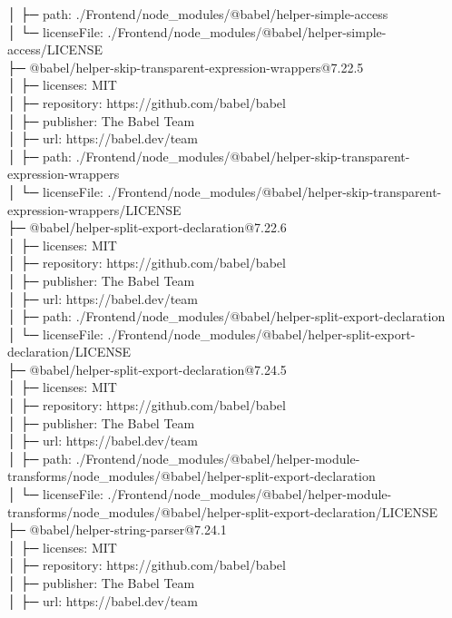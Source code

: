 │  ├─ path: ./Frontend/node\_modules/@babel/helper-simple-access\\
│  └─ licenseFile: ./Frontend/node\_modules/@babel/helper-simple-access/LICENSE\\
├─ @babel/helper-skip-transparent-expression-wrappers@7.22.5\\
│  ├─ licenses: MIT\\
│  ├─ repository: https://github.com/babel/babel\\
│  ├─ publisher: The Babel Team\\
│  ├─ url: https://babel.dev/team\\
│  ├─ path: ./Frontend/node\_modules/@babel/helper-skip-transparent-expression-wrappers\\
│  └─ licenseFile: ./Frontend/node\_modules/@babel/helper-skip-transparent-expression-wrappers/LICENSE\\
├─ @babel/helper-split-export-declaration@7.22.6\\
│  ├─ licenses: MIT\\
│  ├─ repository: https://github.com/babel/babel\\
│  ├─ publisher: The Babel Team\\
│  ├─ url: https://babel.dev/team\\
│  ├─ path: ./Frontend/node\_modules/@babel/helper-split-export-declaration\\
│  └─ licenseFile: ./Frontend/node\_modules/@babel/helper-split-export-declaration/LICENSE\\
├─ @babel/helper-split-export-declaration@7.24.5\\
│  ├─ licenses: MIT\\
│  ├─ repository: https://github.com/babel/babel\\
│  ├─ publisher: The Babel Team\\
│  ├─ url: https://babel.dev/team\\
│  ├─ path: ./Frontend/node\_modules/@babel/helper-module-transforms/node\_modules/@babel/helper-split-export-declaration\\
│  └─ licenseFile: ./Frontend/node\_modules/@babel/helper-module-transforms/node\_modules/@babel/helper-split-export-declaration/LICENSE\\
├─ @babel/helper-string-parser@7.24.1\\
│  ├─ licenses: MIT\\
│  ├─ repository: https://github.com/babel/babel\\
│  ├─ publisher: The Babel Team\\
│  ├─ url: https://babel.dev/team\\

